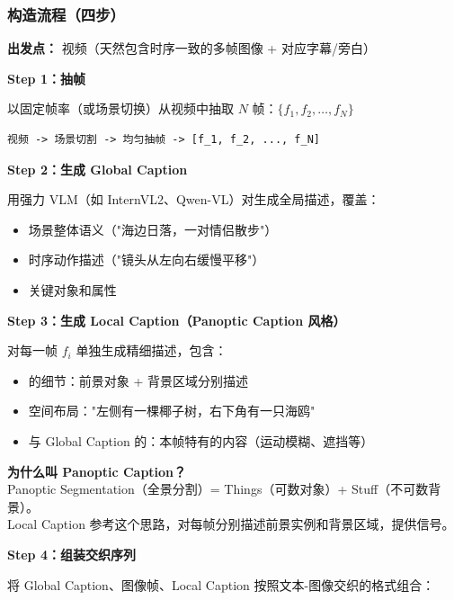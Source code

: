 \subsubsection{构造流程（四步）}

\begin{conceptbox}
\textbf{出发点：} 视频（天然包含时序一致的多帧图像 + 对应字幕/旁白）
\end{conceptbox}

\textbf{Step 1：抽帧}

以固定帧率（或场景切换）从视频中抽取 $N$ 帧：$\{f_1, f_2, \ldots, f_N\}$

\begin{lstlisting}
视频 -> 场景切割 -> 均匀抽帧 -> [f_1, f_2, ..., f_N]
\end{lstlisting}

\textbf{Step 2：生成 Global Caption}

用强力 VLM（如 InternVL2、Qwen-VL）对生成全局描述，覆盖：
\begin{itemize}[leftmargin=1.5em]
  \item 场景整体语义（"海边日落，一对情侣散步"）
  \item 时序动作描述（"镜头从左向右缓慢平移"）
  \item 关键对象和属性
\end{itemize}

\textbf{Step 3：生成 Local Caption（Panoptic Caption 风格）}

对每一帧 $f_i$ 单独生成精细描述，包含：
\begin{itemize}[leftmargin=1.5em]
  \item {}的细节：前景对象 + 背景区域分别描述
  \item 空间布局："左侧有一棵椰子树，右下角有一只海鸥"
  \item 与 Global Caption 的：本帧特有的内容（运动模糊、遮挡等）
\end{itemize}

\begin{intubox}
\textbf{为什么叫 Panoptic Caption？}\\
Panoptic Segmentation（全景分割）= Things（可数对象）+ Stuff（不可数背景）。\\
Local Caption 参考这个思路，对每帧分别描述前景实例和背景区域，提供信号。
\end{intubox}

\textbf{Step 4：组装交织序列}

将 Global Caption、图像帧、Local Caption 按照文本-图像交织的格式组合：

